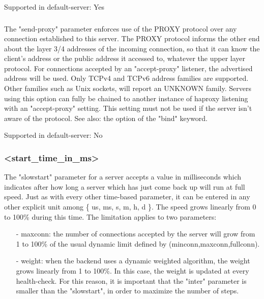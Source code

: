   Supported in default-server: Yes

\subsubsection[send-proxy]{}
  The "send-proxy" parameter enforces use of the PROXY protocol over any
  connection established to this server. The PROXY protocol informs the other
  end about the layer 3/4 addresses of the incoming connection, so that it can
  know the client's address or the public address it accessed to, whatever the
  upper layer protocol. For connections accepted by an "accept-proxy" listener,
  the advertised address will be used. Only TCPv4 and TCPv6 address families
  are supported. Other families such as Unix sockets, will report an UNKNOWN
  family. Servers using this option can fully be chained to another instance of
  haproxy listening with an "accept-proxy" setting. This setting must not be
  used if the server isn't aware of the protocol. See also: the 
  option of the "bind" keyword.

  Supported in default-server: No

\subsubsection[slowstart]{ <start\_time\_in\_ms>}
  The "slowstart" parameter for a server accepts a value in milliseconds which
  indicates after how long a server which has just come back up will run at
  full speed. Just as with every other time-based parameter, it can be entered
  in any other explicit unit among \{ us, ms, s, m, h, d \}. The speed grows
  linearly from 0 to 100\% during this time. The limitation applies to two
  parameters:

  \begin{itemize}
  \item[-] maxconn: the number of connections accepted by the server will grow from 1
    to 100\% of the usual dynamic limit defined by (minconn,maxconn,fullconn).

  \item[-] weight: when the backend uses a dynamic weighted algorithm, the weight
    grows linearly from 1 to 100\%. In this case, the weight is updated at every
    health-check. For this reason, it is important that the "inter" parameter
    is smaller than the "slowstart", in order to maximize the number of steps.
  \end{itemize}

